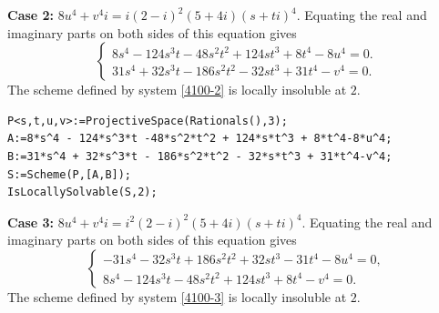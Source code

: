 \documentclass[a4paper,12pt,english,reqno]{amsart}
\begin{document}
{\bf Case 2:} $8u^4+v^4i=i(2-i)^2(5+4i)(s+ti)^4$. Equating the real and imaginary parts on both sides of this equation gives
\begin{equation}\label{4100-2}
\begin{cases}
8s^4 - 124s^3t -48s^2t^2 + 124st^3 + 8t^4-8u^4=0.\\
31s^4 + 32s^3t - 186s^2t^2 - 32st^3 + 31t^4-v^4=0.
\end{cases}
\end{equation}
The scheme defined by system \eqref{4100-2} is locally insoluble at $2$.



\begin{lstlisting}
P<s,t,u,v>:=ProjectiveSpace(Rationals(),3);
A:=8*s^4 - 124*s^3*t -48*s^2*t^2 + 124*s*t^3 + 8*t^4-8*u^4;
B:=31*s^4 + 32*s^3*t - 186*s^2*t^2 - 32*s*t^3 + 31*t^4-v^4;
S:=Scheme(P,[A,B]);
IsLocallySolvable(S,2);
\end{lstlisting}

{\bf Case 3:} $8u^4+v^4i=i^2(2-i)^2(5+4i)(s+ti)^4$. Equating the real and imaginary parts on both sides of this equation gives
\begin{equation}\label{4100-3}
\begin{cases}
- 31s^4 - 32s^3t +186s^2t^2 + 32st^3 - 31t^4-8u^4=0,\\
8s^4 - 124s^3t - 48s^2t^2 + 124st^3 + 8t^4-v^4=0.
\end{cases}
\end{equation}
The scheme defined by system \eqref{4100-3} is locally insoluble at $2$.



\end{document}
